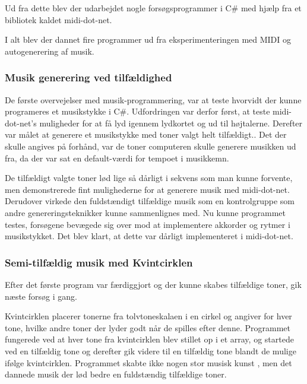 Ud fra dette blev der udarbejdet nogle forsøgsprogrammer i C\# med hjælp fra et bibliotek kaldet midi-dot-net.

I alt blev der dannet fire programmer ud fra eksperimenteringen med MIDI og autogenerering af musik.





\subsubsection{Musik generering ved tilfældighed}

De første overvejelser med musik-programmering, var at teste hvorvidt der kunne programeres et musikstykke i C\#.
Udfordringen var derfor først, at teste midi-dot-net’s muligheder for at få lyd igennem lydkortet og ud til højtalerne.
Derefter var målet at generere et musikstykke med toner valgt helt tilfældigt..
Det der skulle angives på forhånd, var de toner computeren skulle generere musikken ud fra, da der var sat en default-værdi for tempoet i musikkemn.
 

De tilfældigt valgte toner lød lige så dårligt i sekvens som man kunne forvente, men demonstrerede fint mulighederne for at generere musik med midi-dot-net.
Derudover virkede den fuldstændigt tilfældige musik som en kontrolgruppe som andre genereringsteknikker kunne sammenlignes med.
Nu kunne programmet testes, forsøgene bevægede sig over mod at implementere akkorder og rytmer i musikstykket.
Det blev klart, at dette var dårligt implementeret i midi-dot-net.
\cite{CitationNeeded}



\subsubsection{Semi-tilfældig musik med Kvintcirklen}

Efter det første program var færdiggjort og der kunne skabes tilfældige toner, gik næste forsøg i gang.


Kvintcirklen placerer tonerne fra tolvtoneskalaen i en cirkel og angiver for hver tone, hvilke andre toner der lyder godt når de spilles efter denne.
Programmet fungerede ved at hver tone fra kvintcirklen blev stillet op i et array, og startede ved en tilfældig tone og derefter gik videre til en tilfældig tone blandt de mulige ifølge kvintcirklen.
Programmet skabte ikke nogen stor musisk kunst , men det dannede musik der lød bedre en fuldstændig tilfældige toner.
\cite{citation+needed}



